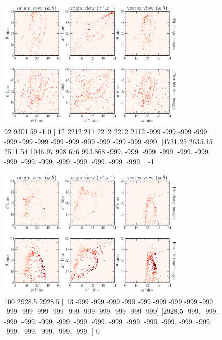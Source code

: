 \begin{figure} %
    \includegraphics[width=0.8\textwidth]{diagrams/7-cvn/chipsnet/explore_nuel_ncdis_event.pdf}
    \caption[explore nuel ncdis event short]
    {92
    9301.59
    -1.0
    [  12 2212  211 2212 2212 2112 -999 -999 -999 -999 -999 -999 -999 -999
    -999 -999 -999 -999 -999 -999]
    [4731.25  2635.15  2511.54  1046.97   998.676  993.868 -999.    -999.
    -999.    -999.    -999.    -999.    -999.    -999.    -999.    -999.
    -999.    -999.    -999.    -999.   ]
    -1
    }
    \label{fig:explore_nuel_ncdis_event}
\end{figure}

\begin{figure} %
    \includegraphics[width=0.8\textwidth]{diagrams/7-cvn/chipsnet/explore_cosmic_event.pdf}
    \caption[explore cosmic event short]
    {100
        2928.5
        2928.5
            [  13 -999 -999 -999 -999 -999 -999 -999 -999 -999 -999 -999 -999 -999
                -999 -999 -999 -999 -999 -999]
            [2928.5 -999.  -999.  -999.  -999.  -999.  -999.  -999.  -999.  -999.
                -999.  -999.  -999.  -999.  -999.  -999.  -999.  -999.  -999.  -999. ]
        0}
    \label{fig:explore_cosmic_event}
\end{figure}

